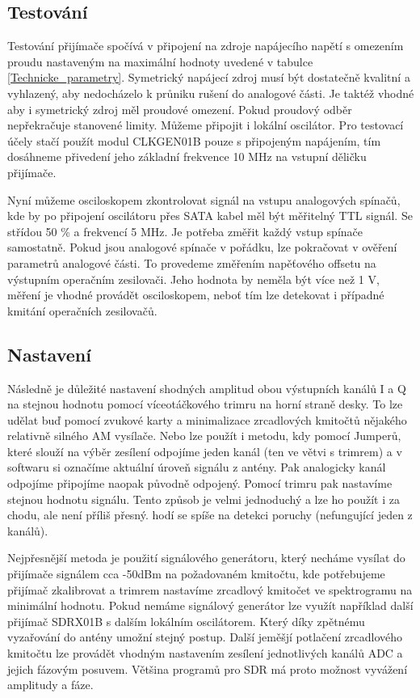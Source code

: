 \documentclass[12pt,a4paper,oneside]{article}
\begin{document}
\subsection{Testování}
Testování přijímače spočívá v připojení na zdroje napájecího napětí s omezením proudu nastaveným na maximální hodnoty uvedené v tabulce \ref{Technicke_parametry}. Symetrický napájecí zdroj musí být dostatečně kvalitní a vyhlazený, aby nedocházelo k průniku rušení do analogové části. Je taktéž vhodné aby i symetrický zdroj měl proudové omezení. Pokud proudový odběr nepřekračuje stanovené limity. Můžeme připojit i lokální oscilátor. Pro testovací účely stačí použít modul CLKGEN01B pouze s připojeným napájením, tím dosáhneme přivedení jeho základní frekvence 10 MHz na vstupní děličku přijímače.  

Nyní můžeme osciloskopem zkontrolovat signál na vstupu analogových spínačů, kde by po připojení oscilátoru přes SATA kabel měl být měřitelný TTL signál. Se střídou 50 \% a frekvencí 5 MHz. Je potřeba změřit každý vstup spínače samostatně.  Pokud jsou analogové spínače v pořádku, lze pokračovat v ověření parametrů analogové části. To provedeme změřením napěťového offsetu na výstupním operačním zesilovači. Jeho hodnota by neměla být více než 1 V, měření je vhodné provádět osciloskopem, neboť tím lze detekovat i případné kmitání operačních zesilovačů. 

\subsection{Nastavení}

Následně je důležité nastavení shodných amplitud obou výstupních kanálů I a Q na stejnou hodnotu pomocí víceotáčkového trimru na horní straně desky. To lze udělat buď pomocí zvukové karty a minimalizace zrcadlových kmitočtů nějakého relativně silného AM vysílače. Nebo lze použít i metodu, kdy pomocí Jumperů, které slouží na výběr zesílení odpojíme jeden kanál (ten ve větvi s trimrem) a v softwaru si označíme aktuální úroveň signálu z antény. Pak analogicky kanál odpojíme připojíme naopak původně odpojený. Pomocí trimru pak nastavíme stejnou hodnotu signálu. Tento způsob je velmi jednoduchý a lze ho použít i za chodu, ale není příliš přesný. hodí se spíše na detekci poruchy (nefungující jeden z kanálů). 

Nejpřesnější metoda je použití signálového generátoru, který necháme vysílat do přijí\-ma\-če signálem cca -50dBm na požadovaném kmitočtu, kde potřebujeme přijímač zkalibrovat a trimrem nastavíme zrcadlový kmitočet ve spektrogramu na minimální hodnotu. Pokud nemáme signálový generátor lze využít například další přijímač SDRX01B s dalším lokálním oscilátorem. Který díky zpětnému vyzařování do antény umožní stejný postup.
Další jeměšjí potlačení zrcadlového kmitočtu lze provádět vhodným nastavením zesílení jednotlivých kanálů ADC a jejich fázovým posuvem. Většina programů pro SDR má proto možnost vyvážení amplitudy a fáze.  
\end{document}
